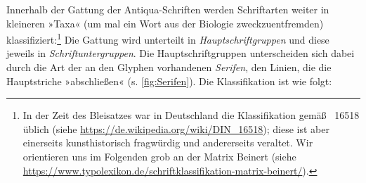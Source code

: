 Innerhalb der Gattung der Antiqua-Schriften werden Schriftarten weiter
in kleineren »Taxa« (um mal ein Wort aus der Biologie
zweckzuentfremden) klassifiziert:\footnote{In der Zeit des Bleisatzes
  war in Deutschland die Klassifikation gemäß ~16518 üblich
  (siehe \url{https://de.wikipedia.org/wiki/DIN_16518}); diese ist
  aber einerseits kunsthistorisch fragwürdig und andererseits
  veraltet.  Wir orientieren uns im Folgenden grob an der Matrix
  Beinert (siehe
  \url{https://www.typolexikon.de/schriftklassifikation-matrix-beinert/}).}
Die Gattung wird unterteilt in \emph{Hauptschriftgruppen} und diese
jeweils in \emph{Schriftuntergruppen}.  Die Hauptschriftgruppen
unterscheiden sich dabei durch die Art der an den Glyphen vorhandenen
\emph{Serifen}, den Linien, die die Hauptstriche »abschließen«
(s. \cref{fig:Serifen}).  Die Klassifikation ist wie folgt:
